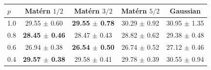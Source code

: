 \begin{tabular}{lcccc}
\toprule
$p$ & Mat\'ern $1/2$ & Mat\'ern $3/2$ & Mat\'ern $5/2$ & Gaussian \\
\midrule
1.0 & 29.55 $\pm$ 0.60 & \textbf{29.55 $\pm$ 0.78} & 30.29 $\pm$ 0.92 & 30.95 $\pm$ 1.35 \\
0.8 & \textbf{28.45 $\pm$ 0.46} & 28.47 $\pm$ 0.43 & 28.82 $\pm$ 0.62 & 29.38 $\pm$ 0.48 \\
0.6 & 26.94 $\pm$ 0.38 & \textbf{26.54 $\pm$ 0.50} & 26.74 $\pm$ 0.52 & 27.12 $\pm$ 0.46 \\
0.4 & \textbf{29.57 $\pm$ 0.38} & 29.58 $\pm$ 0.41 & 29.78 $\pm$ 0.39 & 30.55 $\pm$ 0.94 \\
\bottomrule
\end{tabular}
